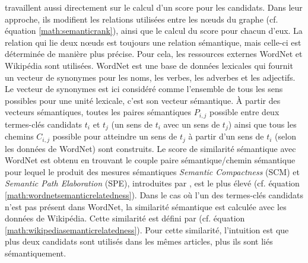            travaillent aussi directement sur
          le calcul d'un score pour les candidats. Dans leur approche, ils
          modifient les relations utilisées entre les n\oe{}uds du graphe (cf.
          équation \ref{math:semanticrank}), ainsi que le calcul du score pour
          chacun d'eux. La relation qui lie deux n\oe{}uds est toujours une
          relation sémantique, mais celle-ci est déterminée de manière plus
          précise. Pour cela, les ressources externes WordNet
          \cite{miller1995wordnet} et Wikipédia sont utilisées. WordNet est une
          base de données lexicales qui fournit un vecteur de synonymes pour les
          noms, les verbes, les adverbes et les adjectifs. Le vecteur de
          synonymes est ici considéré comme l'ensemble de tous les sens
          possibles pour une unité lexicale, c'est son vecteur sémantique. À
          partir des vecteurs sémantiques, toutes les paires sémantiques $P_{i,
          j}$ possible entre deux termes-clés candidats $t_i$ et $t_j$ (un sens
          de $t_i$ avec un sens de $t_j$) ainsi que tous les chemins $C_{i, j}$
          possible pour atteindre un sens de $t_j$ à partir d'un sens de $t_i$
          (selon les données de WordNet) sont construits. Le score de similarité
          sémantique avec WordNet est obtenu en trouvant le couple paire
          sémantique/chemin sémantique pour lequel le produit des mesures
          sémantiques \textit{Semantic Compactness} (SCM) et \textit{Semantic
          Path Elaboration} (SPE), introduites par
          , est le plus élevé (cf.
          équation \ref{math:wordnetsemanticrelatedness}). Dans le cas où l'un
          des termes-clés candidats n'est pas présent dans WordNet, la
          similarité sémantique est calculée avec les données de Wikipédia.
          Cette similarité est défini par
           (cf. équation
          \ref{math:wikipediasemanticrelatedness}). Pour cette similarité,
          l'intuition est que plus deux candidats sont utilisés dans les mêmes
          articles, plus ils sont liés sémantiquement.
